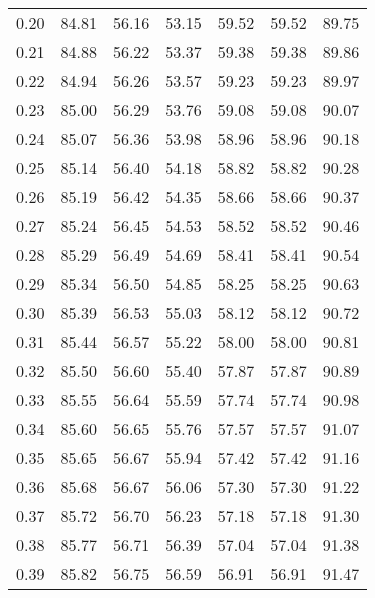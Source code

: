 \begin{tabular}{|c|c|c|c|c|c|c|}
      0.20 &     84.81 &     56.16 &      53.15 &   59.52 &      59.52 &         89.75 \\
      0.21 &     84.88 &     56.22 &      53.37 &   59.38 &      59.38 &         89.86 \\
      0.22 &     84.94 &     56.26 &      53.57 &   59.23 &      59.23 &         89.97 \\
      0.23 &     85.00 &     56.29 &      53.76 &   59.08 &      59.08 &         90.07 \\
      0.24 &     85.07 &     56.36 &      53.98 &   58.96 &      58.96 &         90.18 \\
      0.25 &     85.14 &     56.40 &      54.18 &   58.82 &      58.82 &         90.28 \\
      0.26 &     85.19 &     56.42 &      54.35 &   58.66 &      58.66 &         90.37 \\
      0.27 &     85.24 &     56.45 &      54.53 &   58.52 &      58.52 &         90.46 \\
      0.28 &     85.29 &     56.49 &      54.69 &   58.41 &      58.41 &         90.54 \\
      0.29 &     85.34 &     56.50 &      54.85 &   58.25 &      58.25 &         90.63 \\
      0.30 &     85.39 &     56.53 &      55.03 &   58.12 &      58.12 &         90.72 \\
      0.31 &     85.44 &     56.57 &      55.22 &   58.00 &      58.00 &         90.81 \\
      0.32 &     85.50 &     56.60 &      55.40 &   57.87 &      57.87 &         90.89 \\
      0.33 &     85.55 &     56.64 &      55.59 &   57.74 &      57.74 &         90.98 \\
      0.34 &     85.60 &     56.65 &      55.76 &   57.57 &      57.57 &         91.07 \\
      0.35 &     85.65 &     56.67 &      55.94 &   57.42 &      57.42 &         91.16 \\
      0.36 &     85.68 &     56.67 &      56.06 &   57.30 &      57.30 &         91.22 \\
      0.37 &     85.72 &     56.70 &      56.23 &   57.18 &      57.18 &         91.30 \\
      0.38 &     85.77 &     56.71 &      56.39 &   57.04 &      57.04 &         91.38 \\
      0.39 &     85.82 &     56.75 &      56.59 &   56.91 &      56.91 &         91.47 \\

\end{tabular}
